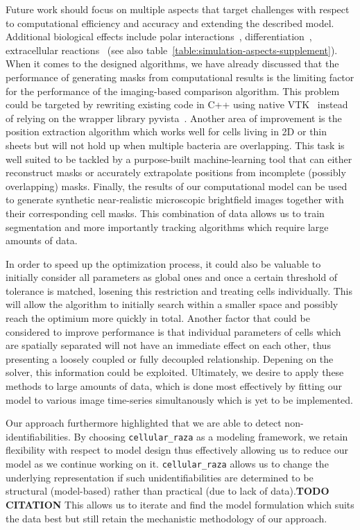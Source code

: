 \documentclass[10pt,letterpaper]{article}
\begin{document}
Future work should focus on multiple aspects that target challenges with respect to computational
efficiency and accuracy and extending the described model.
Additional biological effects include polar interactions~\cite{Duvernoy2018},
differentiation~\cite{vanGestel2015}, extracellular reactions~\cite{Li2025} (see also
table~\ref{table:simulation-aspects-supplement}).
When it comes to the designed algorithms, we have already discussed that the performance of
generating masks from computational results is the limiting factor for the performance of the
imaging-based comparison algorithm.
This problem could be targeted by rewriting existing code in C++ using native VTK~\cite{vtkBook}
instead of relying on the wrapper library pyvista~\cite{Sullivan2019}.
Another area of improvement is the position extraction algorithm which works well for cells living
in 2D or thin sheets but will not hold up when multiple bacteria are overlapping.
This task is well suited to be tackled by a purpose-built machine-learning tool that can either
reconstruct masks or accurately extrapolate positions from incomplete (possibly overlapping) masks.
Finally, the results of our computational model can be used to generate synthetic near-realistic
microscopic brightfield images together with their corresponding cell masks.
This combination of data allows us to train segmentation and more importantly tracking algorithms
which require large amounts of data.

In order to speed up the optimization process, it could also be valuable to initially consider all
parameters as global ones and once a certain threshold of tolerance is matched, losening this
restriction and treating cells individually.
This will allow the algorithm to initially search within a smaller space and possibly reach the
optimium more quickly in total.
Another factor that could be considered to improve performance is that individual parameters of
cells which are spatially separated will not have an immediate effect on each other, thus presenting
a loosely coupled or fully decoupled relationship.
Depening on the solver, this information could be exploited.
Ultimately, we desire to apply these methods to large amounts of data, which is done most
effectively by fitting our model to various image time-series simultanously which is yet to be
implemented.

Our approach furthermore highlighted that we are able to detect non-identifiabilities.
By choosing \texttt{cellular\_raza} as a modeling framework, we retain flexibility with respect to
model design thus effectively allowing us to reduce our model as we continue working on it.
\texttt{cellular\_raza} allows us to change the underlying representation if such unidentifiabilities
are determined to be structural (model-based) rather than practical (due to lack of
data).\textbf{TODO CITATION}
This allows us to iterate and find the model formulation which suits the data best but still retain
the mechanistic methodology of our approach.
\end{document}
